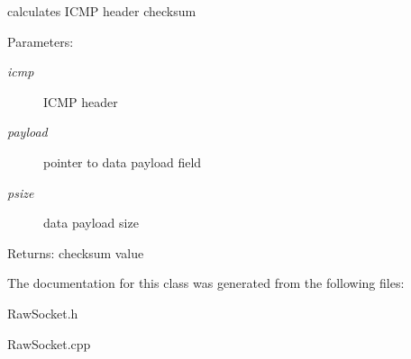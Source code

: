 calculates ICMP header checksum 

\begin{Desc}
\item[Parameters:]
\begin{description}
\item[{\em icmp}]ICMP header \item[{\em payload}]pointer to data payload field \item[{\em psize}]data payload size \end{description}
\end{Desc}
\begin{Desc}
\item[Returns:]checksum value \end{Desc}


The documentation for this class was generated from the following files:\begin{CompactItemize}
\item 
RawSocket.h\item 
RawSocket.cpp\end{CompactItemize}
